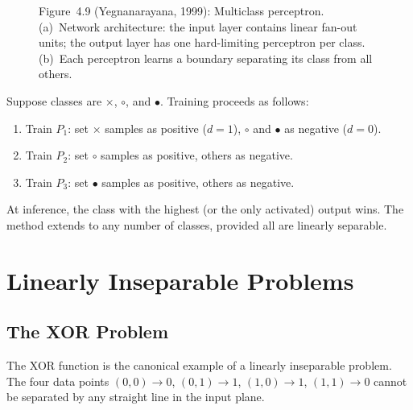 \documentclass[12pt,a4paper]{article}
\begin{document}
\begin{figure}[ht]
\caption{Figure~4.9 (Yegnanarayana, 1999): Multiclass perceptron.
  (a)~Network architecture: the input layer contains linear fan-out units;
  the output layer has one hard-limiting perceptron per class.
  (b)~Each perceptron learns a boundary separating its class from all others.}
\label{fig:multiclass}
\end{figure}

\begin{example}[title=Example -- Three-Class One-vs-All Training]
Suppose classes are $\times$, $\circ$, and $\bullet$.  Training proceeds
as follows:
\begin{enumerate}[noitemsep]
  \item Train $P_1$: set $\times$ samples as positive ($d=1$),
        $\circ$ and $\bullet$ as negative ($d=0$).
  \item Train $P_2$: set $\circ$ samples as positive, others as negative.
  \item Train $P_3$: set $\bullet$ samples as positive, others as negative.
\end{enumerate}
At inference, the class with the highest (or the only activated) output
wins.  The method extends to any number of classes, provided all are
linearly separable.
\end{example}

\section{Linearly Inseparable Problems}
\label{sec:inseparable}

\subsection{The XOR Problem}
\label{subsec:xor}

The XOR function is the canonical example of a linearly inseparable
problem.  The four data points $(0,0) \to 0$, $(0,1) \to 1$,
$(1,0) \to 1$, $(1,1) \to 0$ cannot be separated by any straight line in
the input plane.
\end{document}
